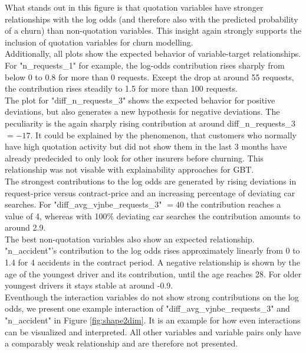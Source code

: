 \documentclass[12pt,titlepage]{article}
\begin{document}
What stands out in this figure is that quotation variables have stronger relationships with the log odds (and therefore also with the predicted probability of a churn) than non-quotation variables. This insight again strongly supports the inclusion of quotation variables for churn modelling. \\
Additionally, all plots show the expected behavior of variable-target relationships. For "n\_requests\_1" for example, the log-odds contribution rises sharply from below 0 to 0.8 for more than 0 requests. Except the drop at around 55 requests, the contribution rises steadily to 1.5 for more than 100 requests. \\
The plot for "diff\_n\_requests\_3" shows the expected behavior for positive deviations, but also generates a new hypothesis for negative deviations. The peculiarity is the again sharply rising contribution at around diff\_n\_requests\_3 $=-17$. It could be explained by the phenomenon, that customers who normally have high quotation activity but did not show them in the last 3 months have already predecided to only look for other insurers before churning. This relationship was not visable with explainability approaches for GBT. \\
The strongest contributions to the log odds are generated by rising deviations in request-price versus contract-price and an increasing percentage of deviating car searches. For "diff\_avg\_vjnbe\_requests\_3" $=40$ the contribution reaches a value of 4, whereas with 100\% deviating car searches the contribution amounts to around 2.9. \\
The best non-quotation variables also show an expected relationship. "n\_accident"'s contribution to the log odds rises approximately linearly from 0 to 1.4 for 4 accidents in the contract period. A negative relationship is shown by the age of the youngest driver and its contribution, until the age reaches 28. For older youngest drivers it stays stable at around -0.9. \\
Eventhough the interaction variables do not show strong contributions on the log odds, we present one example interaction of "diff\_avg\_vjnbe\_requests\_3" and "n\_accident" in Figure \ref{fig:shape2dim}. It is an example for how even interactions can be visualized and interpreted. All other variables and variable pairs only have a comparably weak relationship and are therefore not presented. \\
\end{document}

